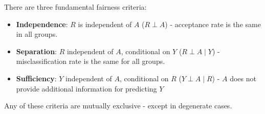 \documentclass{article}
\begin{document}
There are three fundamental fairness criteria:
\begin{itemize}
    \item \textbf{Independence}: $R$ is independent of $A$ ($R \perp A$) - acceptance rate is the same in all groups.
    \item \textbf{Separation}: $R$ independent of $A$, conditional on $Y$ ($R \perp A \mid Y$) - misclassification rate is the same for all groups.
    \item \textbf{Sufficiency}: $Y$ independent of $A$, conditional on $R$ ($Y \perp A \mid R$) - $A$ does not provide additional information for predicting $Y$
\end{itemize}

Any of these criteria are mutually exclusive - except in degenerate cases.
\end{document}
